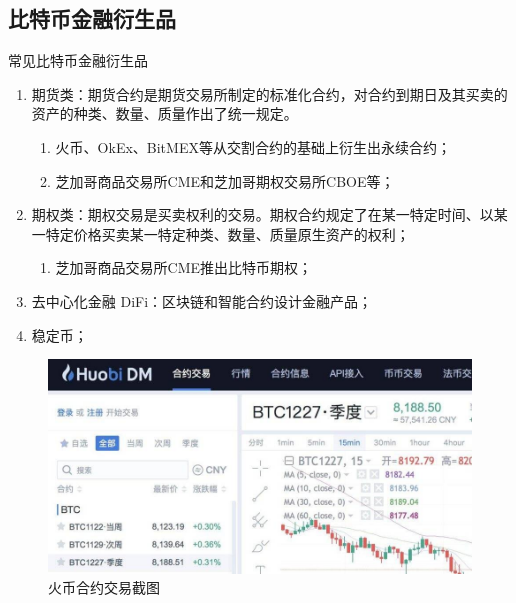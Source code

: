 \documentclass[11pt]{beamer}
\begin{document}
\subsection{比特币金融衍生品}

\begin{frame}{常见比特币金融衍生品}
		\begin{minipage}[t]{0.7\linewidth}
		\footnotesize
	\begin{enumerate}
	\item 期货类：期货合约是期货交易所制定的标准化合约，对合约到期日及其买卖的资产的种类、数量、质量作出了统一规定。
	\begin{enumerate}
		\item 火币、OkEx、BitMEX等从交割合约的基础上衍生出永续合约；
		\item 芝加哥商品交易所CME和芝加哥期权交易所CBOE等；
	\end{enumerate}
	\item 期权类：期权交易是买卖权利的交易。期权合约规定了在某一特定时间、以某一特定价格买卖某一特定种类、数量、质量原生资产的权利；
		\begin{enumerate}
		\item 芝加哥商品交易所CME推出比特币期权；
	\end{enumerate} 
	\item 去中心化金融 DiFi：区块链和智能合约设计金融产品；
	\item 稳定币；
\end{enumerate}
	\end{minipage}%
	\begin{minipage}[t]{0.3\linewidth}
	\begin{figure}
		\centering
		\includegraphics[width=\linewidth]{figures/ccContracts}
		\caption{火币合约交易截图}
	\end{figure}
	\end{minipage}%
\end{frame}
\end{document}

